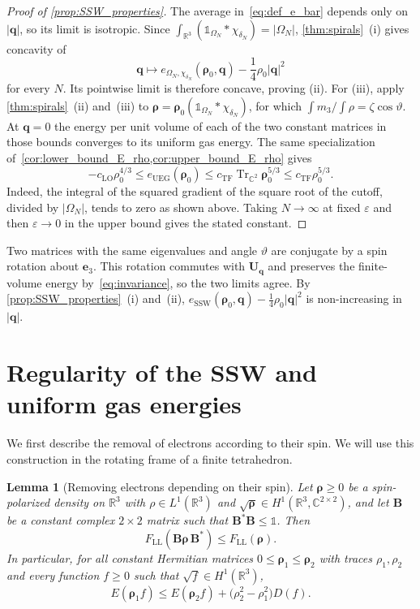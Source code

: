 \documentclass[final,reqno]{amsart}
\newtheorem{lemma}[theorem]{Lemma}
\theoremstyle{remark}
\renewcommand{\le}{\leqslant}
\renewcommand{\ge}{\geqslant}
\renewcommand{\epsilon}{\varepsilon}
\DeclareMathOperator{\Tr}{Tr}
\newcommand{\Trs}{\Tr_{\CC^2}}
\newcommand{\RR}{\mathbb{R}}
\newcommand{\CC}{\mathbb{C}}
\newcommand{\LL}{\mathrm{LL}}
\newcommand{\TF}{\mathrm{TF}}
\newcommand{\LO}{\mathrm{LO}}
\newcommand{\UEG}{\mathrm{UEG}}
\newcommand{\SSW}{\mathrm{SSW}}
\newcommand{\iden}{\mathbb{1}}
\begin{document}
\begin{proof}[Proof of \cref{prop:SSW_properties}]
The average in~\cref{eq:def_e_bar} depends only on $|\mathbf{q}|$, so its limit is isotropic. Since $\int_{\RR^3}(\iden_{\Omega_N}\ast\chi_{\delta_N})=|\Omega_N|$, \cref{thm:spirals}~(i) gives concavity of
\[
 \mathbf{q}\longmapsto
 e_{\Omega_N,\chi_{\delta_N}}(\bm{\rho}_0,\mathbf{q})
 -\frac14\rho_0|\mathbf{q}|^2
\]
for every $N$. Its pointwise limit is therefore concave, proving (ii). For (iii), apply \cref{thm:spirals}~(ii) and~(iii) to $\bm{\rho}=\bm{\rho}_0(\iden_{\Omega_N}\ast\chi_{\delta_N})$, for which $\int m_3/\int\rho=\zeta\cos\vartheta$. At $\mathbf{q}=0$ the energy per unit volume of each of the two constant matrices in those bounds converges to its uniform gas energy. The same specialization of~\cref{cor:lower_bound_E_rho,cor:upper_bound_E_rho} gives
\begin{equation}\label{eq:estim_simple_UEG}
-c_\LO\rho_0^{4/3}\le e_\UEG(\bm{\rho}_0)\le c_\TF\Trs\bm{\rho}_0^{5/3}\le c_\TF\rho_0^{5/3}.
\end{equation}
Indeed, the integral of the squared gradient of the square root of the cutoff, divided by $|\Omega_N|$, tends to zero as shown above. Taking $N\to\infty$ at fixed $\epsilon$ and then $\epsilon\to0$ in the upper bound gives the stated constant.
\end{proof}

Two matrices with the same eigenvalues and angle $\vartheta$ are conjugate by a spin rotation about $\mathbf{e}_3$. This rotation commutes with $\mathbf{U}_{\mathbf{q}}$ and preserves the finite-volume energy by~\cref{eq:invariance}, so the two limits agree. By \cref{prop:SSW_properties}~(i) and~(ii), $e_\SSW(\bm{\rho}_0,\mathbf{q})-\frac14\rho_0|\mathbf{q}|^2$ is non-increasing in $|\mathbf{q}|$.

\section{Regularity of the SSW and uniform gas energies}\label{app:Lipschitz_SSW}

We first describe the removal of electrons according to their spin. We will use this construction in the rotating frame of a finite tetrahedron.

\begin{lemma}[Removing electrons depending on their spin]\label{lem:monotone}
Let $\bm{\rho}\ge0$ be a spin-polarized density on $\RR^3$ with $\rho\in L^1(\RR^3)$ and $\sqrt{\bm{\rho}}\in H^1(\RR^3,\CC^{2\times2})$, and let $\mathbf{B}$ be a constant complex $2\times2$ matrix such that $\mathbf{B}^*\mathbf{B}\le\iden$. Then
\begin{equation}\label{eq:monotone_F}
F_\LL(\mathbf{B}\bm{\rho}\,\mathbf{B}^*)\le F_\LL(\bm{\rho}).
\end{equation}
In particular, for all constant Hermitian matrices $0\le \bm{\rho}_1\le \bm{\rho}_2$ with traces $\rho_1,\rho_2$ and every function $f\ge0$ such that $\sqrt{f}\in H^1(\RR^3)$,
\begin{equation}\label{eq:monotone}
E(\bm{\rho}_1f)\le E(\bm{\rho}_2f)+\big(\rho_2^2-\rho_1^2\big)D(f).
\end{equation}
\end{lemma}
\end{document}
